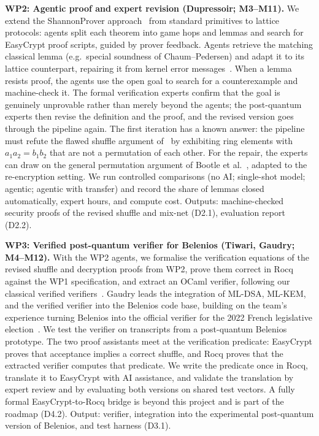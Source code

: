 \documentclass[11pt]{article}
\begin{document}
\textbf{WP2: Agentic proof and expert revision (Dupressoir; M3--M11).} We extend the ShannonProver
approach~\cite{ma2026shannonprover} from standard primitives to lattice protocols: agents split each theorem into
game hops and lemmas and search for EasyCrypt proof scripts, guided by prover feedback. Agents retrieve the matching
classical lemma (e.g.\ special soundness of Chaum--Pedersen) and adapt it to its lattice counterpart, repairing it
from kernel error messages~\cite{first2023baldur}. When a lemma resists proof, the agents use the open goal to search
for a counterexample and machine-check it. The formal verification experts confirm that the goal is genuinely
unprovable rather than merely beyond the agents; the post-quantum experts then revise the definition and the proof,
and the revised version goes through the pipeline again. The first iteration has a known answer: the pipeline must refute the flawed shuffle
argument of~\cite{aranha2021shuffle} by exhibiting ring elements with $a_1a_2=b_1b_2$ that are not a permutation of
each other. For the repair, the experts can draw on the general permutation argument of Bootle et
al.~\cite{bootle2025mixnets}, adapted to the re-encryption setting. We run controlled
comparisons (no AI; single-shot model; agentic; agentic with transfer) and record the share of lemmas closed
automatically, expert hours, and compute cost. Outputs: machine-checked security proofs of the revised shuffle and mix-net (D2.1), evaluation report (D2.2).

\textbf{WP3: Verified post-quantum verifier for Belenios (Tiwari, Gaudry; M4--M12).} With the WP2 agents, we formalise the
verification equations of the revised shuffle and decryption proofs from WP2, prove them correct in Rocq
against the WP1 specification, and extract an OCaml verifier, following our classical verified
verifiers~\cite{haines2019verified,287095}. Gaudry leads the integration of ML-DSA, ML-KEM, and the verified verifier
into the Belenios code base, building on the team's experience turning Belenios into the official verifier for the 2022
French legislative election~\cite{vvfe,cortier2023french}. We test the verifier on transcripts from a post-quantum
Belenios prototype. The two proof assistants meet at the verification predicate: EasyCrypt proves that acceptance
implies a correct shuffle, and Rocq proves that the extracted verifier computes that predicate. We write the
predicate once in Rocq, translate it to EasyCrypt with AI assistance, and validate the translation by expert review
and by evaluating both versions on shared test vectors. A fully formal EasyCrypt-to-Rocq bridge is beyond this
project and is part of the roadmap (D4.2). Output: verifier, integration into the experimental post-quantum version of Belenios, and test harness (D3.1).
\end{document}
